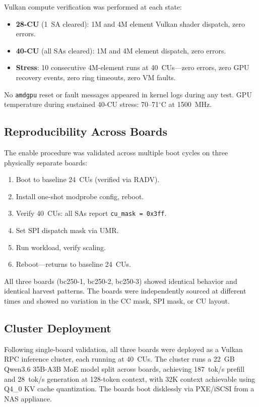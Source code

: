 \documentclass[11pt,twocolumn]{article}
\begin{document}
Vulkan compute verification was performed at each state:

\begin{itemize}[nosep]
    \item \textbf{28-CU} (1~SA cleared): 1M and 4M element Vulkan shader dispatch, zero errors.
    \item \textbf{40-CU} (all SAs cleared): 1M and 4M element dispatch, zero errors.
    \item \textbf{Stress}: 10 consecutive 4M-element runs at 40~CUs---zero errors, zero GPU recovery events, zero ring timeouts, zero VM faults.
\end{itemize}

No \texttt{amdgpu} reset or fault messages appeared in kernel logs during any test. GPU temperature during sustained 40-CU stress: 70--71$^\circ$C at 1500~MHz.

\subsection{Reproducibility Across Boards}

The enable procedure was validated across multiple boot cycles on three physically separate boards:

\begin{enumerate}[nosep]
    \item Boot to baseline 24~CUs (verified via RADV).
    \item Install one-shot modprobe config, reboot.
    \item Verify 40~CUs: all SAs report \texttt{cu\_mask\,=\,0x3ff}.
    \item Set SPI dispatch mask via UMR.
    \item Run workload, verify scaling.
    \item Reboot---returns to baseline 24~CUs.
\end{enumerate}

All three boards (bc250-1, bc250-2, bc250-3) showed identical behavior and identical harvest patterns. The boards were independently sourced at different times and showed no variation in the CC mask, SPI mask, or CU layout.

\subsection{Cluster Deployment}

Following single-board validation, all three boards were deployed as a Vulkan RPC inference cluster, each running at 40~CUs. The cluster runs a 22~GB Qwen3.6 35B-A3B MoE model split across boards, achieving 187~tok/s prefill and 28~tok/s generation at 128-token context, with 32K context achievable using Q4\_0 KV cache quantization. The boards boot disklessly via PXE/iSCSI from a NAS appliance.
\end{document}
